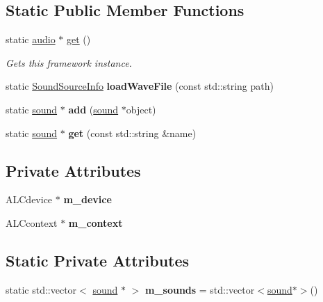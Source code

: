 \subsection*{Static Public Member Functions}
\begin{DoxyCompactItemize}
\item 
static \hyperlink{classflounder_1_1audio}{audio} $\ast$ \hyperlink{classflounder_1_1audio_ac827774b8855e8a921ef9141c2515df8}{get} ()
\begin{DoxyCompactList}\small\item\em Gets this framework instance. \end{DoxyCompactList}\item 
\mbox{\label{classflounder_1_1audio_a44aefffd9251716e6d0ec6d058c2bcdd}} 
static \hyperlink{structflounder_1_1_sound_source_info}{Sound\+Source\+Info} {\bfseries load\+Wave\+File} (const std\+::string path)
\item 
\mbox{\label{classflounder_1_1audio_adcf594644890f93b9651b2a60c6cfb26}} 
static \hyperlink{classflounder_1_1sound}{sound} $\ast$ {\bfseries add} (\hyperlink{classflounder_1_1sound}{sound} $\ast$object)
\item 
\mbox{\label{classflounder_1_1audio_a6f8a589c9adb8f6ef258d56f624ee0a5}} 
static \hyperlink{classflounder_1_1sound}{sound} $\ast$ {\bfseries get} (const std\+::string \&name)
\end{DoxyCompactItemize}
\subsection*{Private Attributes}
\begin{DoxyCompactItemize}
\item 
\mbox{\label{classflounder_1_1audio_a6e577784668fbd39f2d6aa8e45bd2983}} 
A\+L\+Cdevice $\ast$ {\bfseries m\+\_\+device}
\item 
\mbox{\label{classflounder_1_1audio_a361e675d6029769f9a366354a3e1cb61}} 
A\+L\+Ccontext $\ast$ {\bfseries m\+\_\+context}
\end{DoxyCompactItemize}
\subsection*{Static Private Attributes}
\begin{DoxyCompactItemize}
\item 
\mbox{\label{classflounder_1_1audio_a60edae723dfd91b038b076140f7dfc6a}} 
static std\+::vector$<$ \hyperlink{classflounder_1_1sound}{sound} $\ast$ $>$ {\bfseries m\+\_\+sounds} = std\+::vector$<$\hyperlink{classflounder_1_1sound}{sound}$\ast$$>$()
\end{DoxyCompactItemize}
